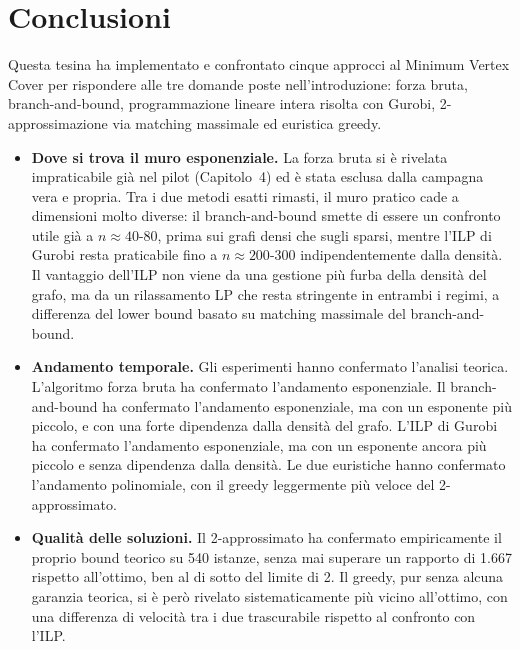 \chapter*{Conclusioni}

Questa tesina ha implementato e confrontato cinque approcci al Minimum Vertex Cover per rispondere alle tre domande poste nell'introduzione: forza bruta, branch-and-bound, programmazione lineare intera risolta con Gurobi, 2-approssimazione via matching massimale ed euristica greedy.

\begin{itemize}
    \item \textbf{Dove si trova il muro esponenziale.} La forza bruta si è rivelata impraticabile già nel pilot (Capitolo~4) ed è stata esclusa dalla campagna vera e propria. Tra i due metodi esatti rimasti, il muro pratico cade a dimensioni molto diverse: il branch-and-bound smette di essere un confronto utile già a $n\approx 40$-$80$, prima sui grafi densi che sugli sparsi, mentre l'ILP di Gurobi resta praticabile fino a $n\approx 200$-$300$ indipendentemente dalla densità. Il vantaggio dell'ILP non viene da una gestione più furba della densità del grafo, ma da un rilassamento LP che resta stringente in entrambi i regimi, a differenza del lower bound basato su matching massimale del branch-and-bound.
    \item \textbf{Andamento temporale.} Gli esperimenti hanno confermato l'analisi teorica. L'algoritmo forza bruta ha confermato l'andamento esponenziale. Il branch-and-bound ha confermato l'andamento esponenziale, ma con un esponente più piccolo, e con una forte dipendenza dalla densità del grafo. L'ILP di Gurobi ha confermato l'andamento esponenziale, ma con un esponente ancora più piccolo e senza dipendenza dalla densità. Le due euristiche hanno confermato l'andamento polinomiale, con il greedy leggermente più veloce del 2-approssimato.    
    \item \textbf{Qualità delle soluzioni.} Il 2-approssimato ha confermato empiricamente il proprio bound teorico su 540 istanze, senza mai superare un rapporto di 1.667 rispetto all'ottimo, ben al di sotto del limite di 2. Il greedy, pur senza alcuna garanzia teorica, si è però rivelato sistematicamente più vicino all'ottimo, con una differenza di velocità tra i due trascurabile rispetto al confronto con l'ILP.
\end{itemize}


